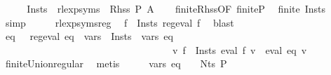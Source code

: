 \begin{isabellebody}
%
\isadelimproof
%
\endisadelimproof
%
\isatagproof
{}\isamarkupfalse%
\ {\isacharminus}{\kern0pt}\isanewline
\ \ \isamarkupfalse%
\ {\isacharquery}{\kern0pt}Insts\ {\isacharequal}{\kern0pt}\ {\isachardoublequoteopen}rlexp{\isacharunderscore}{\kern0pt}syms\ {\isacharbackquote}{\kern0pt}\ {\isacharparenleft}{\kern0pt}Rhss\ P\ A{\isacharparenright}{\kern0pt}{\isachardoublequoteclose}\isanewline
\ \ \isamarkupfalse%
\ finite{\isacharunderscore}{\kern0pt}Rhss{\isacharbrackleft}{\kern0pt}OF\ finite{\isacharunderscore}{\kern0pt}P{\isacharbrackright}{\kern0pt}\ \isamarkupfalse%
\ {\isachardoublequoteopen}finite\ {\isacharquery}{\kern0pt}Insts{\isachardoublequoteclose}\ \isamarkupfalse%
\ simp\isanewline
\ \ \isamarkupfalse%
\ \isamarkupfalse%
\ rlexp{\isacharunderscore}{\kern0pt}syms{\isacharunderscore}{\kern0pt}reg\ \isamarkupfalse%
\ {\isachardoublequoteopen}{\isasymforall}f\ {\isasymin}\ {\isacharquery}{\kern0pt}Insts{\isachardot}{\kern0pt}\ reg{\isacharunderscore}{\kern0pt}eval\ f{\isachardoublequoteclose}\ \isamarkupfalse%
\ blast\isanewline
\ \ \isamarkupfalse%
\ \isamarkupfalse%
\ eq\ \ {\isacharasterisk}{\kern0pt}{\isacharcolon}{\kern0pt}\ {\isachardoublequoteopen}reg{\isacharunderscore}{\kern0pt}eval\ eq\ {\isasymand}\ {\isasymUnion}{\isacharparenleft}{\kern0pt}vars\ {\isacharbackquote}{\kern0pt}\ {\isacharquery}{\kern0pt}Insts{\isacharparenright}{\kern0pt}\ {\isacharequal}{\kern0pt}\ vars\ eq\isanewline
\ \ \ \ \ \ \ \ \ \ \ \ \ \ \ \ \ \ \ \ \ \ \ \ \ \ \ \ \ \ \ \ \ \ {\isasymand}\ {\isacharparenleft}{\kern0pt}{\isasymforall}v{\isachardot}{\kern0pt}\ {\isacharparenleft}{\kern0pt}{\isasymUnion}f\ {\isasymin}\ {\isacharquery}{\kern0pt}Insts{\isachardot}{\kern0pt}\ eval\ f\ v{\isacharparenright}{\kern0pt}\ {\isacharequal}{\kern0pt}\ eval\ eq\ v{\isacharparenright}{\kern0pt}{\isachardoublequoteclose}\isanewline
\ \ \ \ \isamarkupfalse%
\ finite{\isacharunderscore}{\kern0pt}Union{\isacharunderscore}{\kern0pt}regular\ \isamarkupfalse%
\ metis\isanewline
\ \ \isamarkupfalse%
\ \isamarkupfalse%
\ {\isachardoublequoteopen}vars\ eq\ {\isasymsubseteq}\ {\isasymgamma}{\isacharprime}{\kern0pt}\ {\isacharbackquote}{\kern0pt}\ Nts\ P{\isachardoublequoteclose}\isanewline
\ \ \isamarkupfalse%
\isanewline
\ \ \ \ \isamarkupfalse%

\end{isabellebody}
